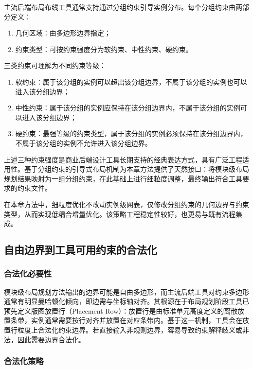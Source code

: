 主流后端布局布线工具通常支持通过分组约束引导实例分布。每个分组约束由两部分定义：
\begin{enumerate}
    \item 几何区域：由多边形边界指定；
    \item 约束类型：可按约束强度分为软约束、中性约束、硬约束。
\end{enumerate}

三类约束可理解为不同约束等级：
\begin{enumerate}
    \item 软约束：属于该分组的实例可以超出该分组边界，不属于该分组的实例也可以进入该分组边界；
    \item 中性约束：属于该分组的实例应保持在该分组边界内，不属于该分组的实例可以进入该分组边界；
    \item 硬约束：最强等级的约束类型，属于该分组的实例必须保持在该分组边界内，不属于该分组的实例不允许进入该分组边界。
\end{enumerate}

上述三种约束强度是商业后端设计工具长期支持的经典表达方式，具有广泛工程适用性。基于分组约束的引导式布局机制为本章方法提供了天然接口：将模块级布局规划结果映射为一组分组约束，在此基础上进行细粒度调整，最终输出符合工具要求的约束文件。

在本章方法中，细粒度优化不改动实例级网表，仅修改分组约束的几何边界与约束类型，从而实现低耦合增量优化。该策略工程稳定性较好，也更易与既有流程集成。

\subsection{自由边界到工具可用约束的合法化}
\label{sec:chap4-legalization}

\subsubsection{合法化必要性}
\label{sec:chap4-legalization-need}

模块级布局规划方法输出的边界可能是自由多边形，而主流后端工具对约束多边形通常有明显曼哈顿化倾向，即边需与坐标轴对齐。其根源在于布局规划阶段工具已预先定义版图放置行（Placement Row）：放置行是由标准单元高度定义的离散放置条带，实例通常需要按行对齐并放置在对应条带内。基于这一机制，工具会在放置行粒度上合法化约束边界。若直接输入非规则边界，容易导致约束解释歧义或非法，因此需要边界合法化。

\subsubsection{合法化策略}
\label{sec:chap4-legalization-strategy}

